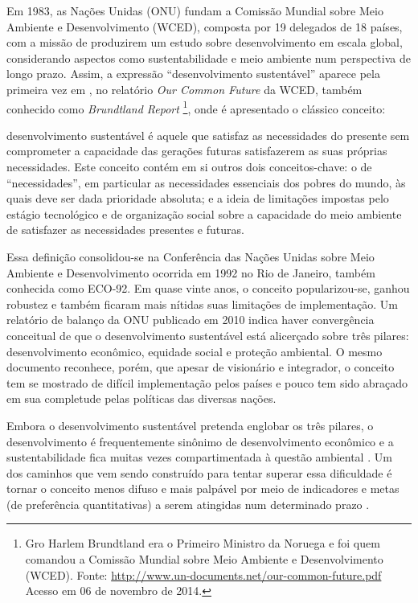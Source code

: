 Em 1983, as Nações Unidas (ONU) fundam a Comissão Mundial sobre Meio Ambiente e Desenvolvimento (WCED), composta por 19 delegados de 18 países, com a missão de produzirem um estudo sobre desenvolvimento em escala global, considerando aspectos como sustentabilidade e meio ambiente num perspectiva de longo prazo. Assim, a expressão ``desenvolvimento sustentável'' aparece pela primeira vez em \citeyear{WCED1987}, no relatório \emph{Our Common Future} da WCED, também conhecido como \emph{Brundtland Report}%
\footnote{Gro Harlem Brundtland era o Primeiro Ministro da Noruega e foi quem comandou a Comissão Mundial sobre Meio Ambiente e Desenvolvimento (WCED). Fonte: \url{http://www.un-documents.net/our-common-future.pdf} Acesso em 06 de novembro de 2014.}, onde é apresentado o clássico conceito:

\begin{citacao}
desenvolvimento sustentável é aquele que satisfaz as necessidades do presente sem comprometer a capacidade das gerações futuras satisfazerem as suas próprias necessidades. Este conceito contém em si outros dois conceitos-chave: o de ``necessidades'', em particular as necessidades essenciais dos pobres do mundo, às quais deve ser dada prioridade absoluta; e a ideia de limitações impostas pelo estágio tecnológico e de organização social sobre a capacidade do meio ambiente de satisfazer as necessidades presentes e futuras. 
\cite[p.41]{WCED1987}
\end{citacao}   

Essa definição consolidou-se na Conferência das Nações Unidas sobre Meio Ambiente e Desenvolvimento ocorrida em 1992 no Rio de Janeiro, também conhecida como ECO-92. Em quase vinte anos, o conceito popularizou-se, ganhou robustez e também ficaram mais nítidas suas limitações de implementação. Um relatório de balanço da ONU publicado em 2010 \cite{ONU2010} indica haver convergência conceitual de que o desenvolvimento sustentável está alicerçado sobre três pilares: desenvolvimento econômico, equidade social e proteção ambiental. O mesmo documento reconhece, porém, que apesar de visionário e integrador, o conceito tem se mostrado de difícil implementação pelos países e pouco tem sido abraçado em sua completude pelas políticas das diversas nações. 

Embora o desenvolvimento sustentável pretenda englobar os três pilares, o desenvolvimento é frequentemente sinônimo de desenvolvimento econômico e a sustentabilidade fica muitas vezes compartimentada à questão ambiental \cite{ONU2010}. Um dos caminhos que vem sendo construído para tentar superar essa dificuldade é tornar o conceito menos difuso e mais palpável por meio de indicadores \cite{CHAMBERS2000,BOULANGER2008,BARRETT2010,FORTES2012} e metas (de preferência quantitativas) a serem atingidas num determinado prazo \cite{ONU2010,ONU2014}.

